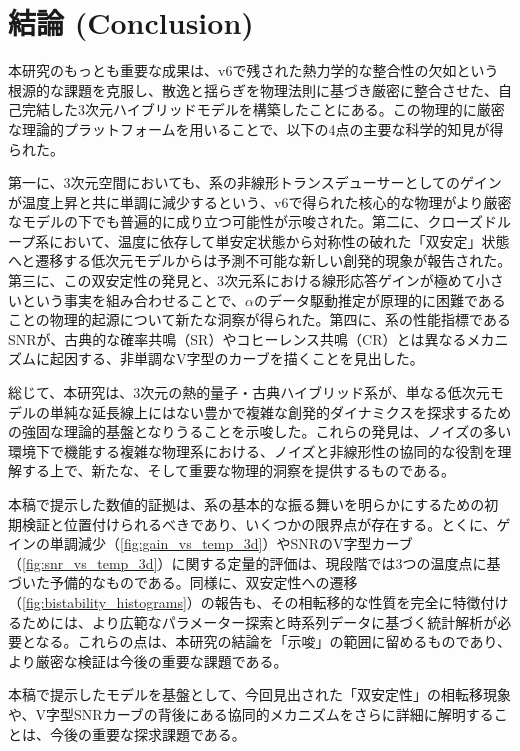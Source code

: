 \documentclass[a4paper,11pt,ja=standard,lualatex]{bxjsarticle}
\newcommand{\figref}[1]{\cref{#1}}
\begin{document}
\section{結論 (Conclusion)}
\label{sec:conclusion}
本研究のもっとも重要な成果は、v6で残された熱力学的な整合性の欠如という根源的な課題を克服し、散逸と揺らぎを物理法則に基づき厳密に整合させた、自己完結した3次元ハイブリッドモデルを構築したことにある。この物理的に厳密な理論的プラットフォームを用いることで、以下の4点の主要な科学的知見が得られた。

第一に、3次元空間においても、系の非線形トランスデューサーとしてのゲインが温度上昇と共に単調に減少するという、v6で得られた核心的な物理がより厳密なモデルの下でも普遍的に成り立つ可能性が示唆された。第二に、クローズドループ系において、温度に依存して単安定状態から対称性の破れた「\mbox{双安定}」状態へと遷移する低次元モデルからは予測不可能な新しい\mbox{創発}的現象が報告された。第三に、この\mbox{双安定}性の発見と、3次元系における線形応答ゲインが極めて小さいという事実を組み合わせることで、$\alpha$のデータ駆動推定が原理的に困難であることの物理的起源について新たな洞察が得られた。第四に、系の性能指標であるSNRが、古典的な確率共鳴（SR）やコヒーレンス共鳴（CR）とは異なるメカニズムに起因する、非単調なV字型のカーブを描くことを見出した。

総じて、本研究は、3次元の熱的量子・古典ハイブリッド系が、単なる低次元モデルの単純な延長線上にはない豊かで複雑な\mbox{創発}的ダイナミクスを探求するための強固な理論的基盤となりうることを示唆した。これらの発見は、ノイズの多い環境下で機能する複雑な物理系における、ノイズと非線形性の協同的な役割を理解する上で、新たな、そして重要な物理的洞察を提供するものである。

本稿で提示した数値的証拠は、系の基本的な振る舞いを明らかにするための初期検証と位置付けられるべきであり、いくつかの限界点が存在する。とくに、ゲインの単調減少（\figref{fig:gain_vs_temp_3d}）やSNRのV字型カーブ（\figref{fig:snr_vs_temp_3d}）に関する定量的評価は、現段階では3つの温度点に基づいた予備的なものである。同様に、\mbox{双安定}性への遷移（\figref{fig:bistability_histograms}）の報告も、その相転移的な性質を完全に特徴付けるためには、より広範なパラメーター探索と時系列データに基づく統計解析が必要となる。これらの点は、本研究の結論を「示唆」の範囲に留めるものであり、より厳密な検証は今後の重要な課題である。

本稿で提示したモデルを基盤として、今回見出された「\mbox{双安定}性」の相転移現象や、V字型SNRカーブの背後にある協同的メカニズムをさらに詳細に解明することは、今後の重要な探求課題である。
\end{document}
